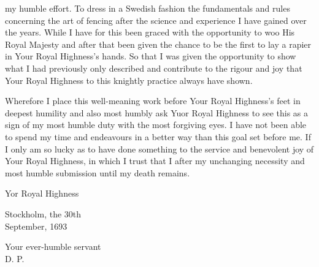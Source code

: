 \newpage


\newpage


my humble effort.
To dress in a Swedish fashion the fundamentals and
rules concerning the art of fencing after the science and experience I
have gained over the years.
While I have for this been graced with the opportunity to woo His
Royal Majesty and after that been given the chance to be the first to
lay a rapier in Your Royal Highness's hands. So that I was given the
opportunity to show what I had previously only described and
contribute to the rigour and joy that Your Royal Highness to this
knightly practice always have shown.

Wherefore I place this well-meaning work before Your Royal Highness's
feet in deepest humility and also most humbly ask Yuor Royal Highness
to see this as a sign of my most humble duty with the most forgiving
eyes. I have not been able to spend my time and endeavours in a better
way than this goal set before me. If I only am so lucky as to have
done something to the service and benevolent joy of Your Royal
Highness, in which I trust that I after my unchanging necessity and
most humble submission until my death remains.

Yor Royal Highness

Stockholm, the 30th \\
September, 1693

Your ever-humble servant \\
D. P.


